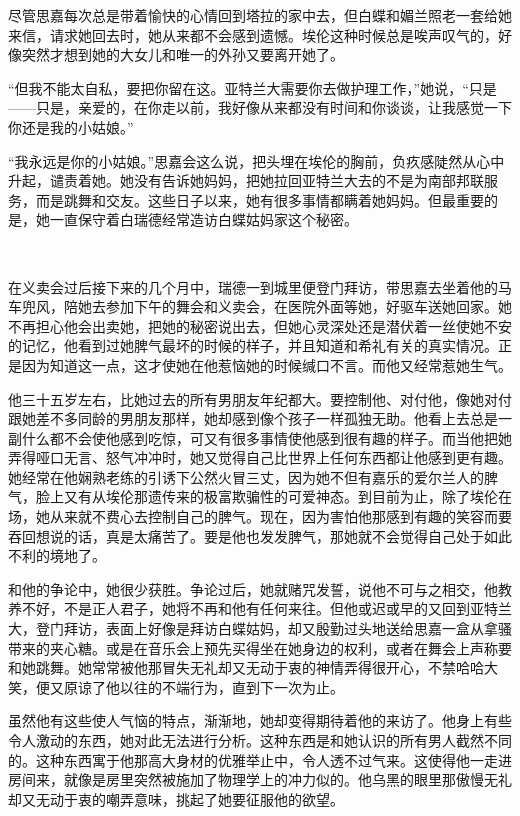 \par 尽管思嘉每次总是带着愉快的心情回到塔拉的家中去，但白蝶和媚兰照老一套给她来信，请求她回去时，她从来都不会感到遗憾。埃伦这种时候总是唉声叹气的，好像突然才想到她的大女儿和唯一的外孙又要离开她了。
\par “但我不能太自私，要把你留在这。亚特兰大需要你去做护理工作，”她说，“只是——只是，亲爱的，在你走以前，我好像从来都没有时间和你谈谈，让我感觉一下你还是我的小姑娘。”
\par “我永远是你的小姑娘。”思嘉会这么说，把头埋在埃伦的胸前，负疚感陡然从心中升起，谴责着她。她没有告诉她妈妈，把她拉回亚特兰大去的不是为南部邦联服务，而是跳舞和交友。这些日子以来，她有很多事情都瞒着她妈妈。但最重要的是，她一直保守着白瑞德经常造访白蝶姑妈家这个秘密。
\par  
\par 在义卖会过后接下来的几个月中，瑞德一到城里便登门拜访，带思嘉去坐着他的马车兜风，陪她去参加下午的舞会和义卖会，在医院外面等她，好驱车送她回家。她不再担心他会出卖她，把她的秘密说出去，但她心灵深处还是潜伏着一丝使她不安的记忆，他看到过她脾气最坏的时候的样子，并且知道和希礼有关的真实情况。正是因为知道这一点，这才使她在他惹恼她的时候缄口不言。而他又经常惹她生气。
\par 他三十五岁左右，比她过去的所有男朋友年纪都大。要控制他、对付他，像她对付跟她差不多同龄的男朋友那样，她却感到像个孩子一样孤独无助。他看上去总是一副什么都不会使他感到吃惊，可又有很多事情使他感到很有趣的样子。而当他把她弄得哑口无言、怒气冲冲时，她又觉得自己比世界上任何东西都让他感到更有趣。她经常在他娴熟老练的引诱下公然火冒三丈，因为她不但有嘉乐的爱尔兰人的脾气，脸上又有从埃伦那遗传来的极富欺骗性的可爱神态。到目前为止，除了埃伦在场，她从来就不费心去控制自己的脾气。现在，因为害怕他那感到有趣的笑容而要吞回想说的话，真是太痛苦了。要是他也发发脾气，那她就不会觉得自己处于如此不利的境地了。
\par 和他的争论中，她很少获胜。争论过后，她就赌咒发誓，说他不可与之相交，他教养不好，不是正人君子，她将不再和他有任何来往。但他或迟或早的又回到亚特兰大，登门拜访，表面上好像是拜访白蝶姑妈，却又殷勤过头地送给思嘉一盒从拿骚带来的夹心糖。或是在音乐会上预先买得坐在她身边的权利，或者在舞会上声称要和她跳舞。她常常被他那冒失无礼却又无动于衷的神情弄得很开心，不禁哈哈大笑，便又原谅了他以往的不端行为，直到下一次为止。
\par 虽然他有这些使人气恼的特点，渐渐地，她却变得期待着他的来访了。他身上有些令人激动的东西，她对此无法进行分析。这种东西是和她认识的所有男人截然不同的。这种东西寓于他那高大身材的优雅举止中，令人透不过气来。这使得他一走进房间来，就像是房里突然被施加了物理学上的冲力似的。他乌黑的眼里那傲慢无礼却又无动于衷的嘲弄意味，挑起了她要征服他的欲望。
